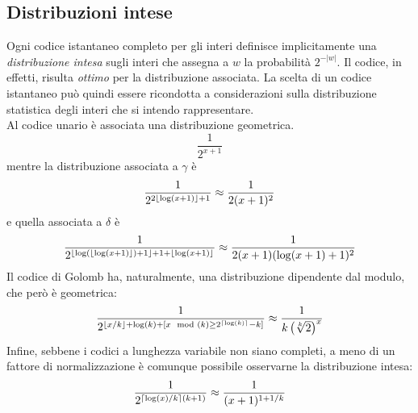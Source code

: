 
\subsection{Distribuzioni intese}
Ogni codice istantaneo completo per gli interi definisce implicitamente una \textit{distribuzione intesa} sugli interi che assegna a $w$ la probabilità $2^{-|w|}$. Il codice, in effetti, risulta \textit{ottimo} per la distribuzione associata. La scelta di un codice istantaneo può quindi essere ricondotta a considerazioni sulla distribuzione statistica degli interi che si intendo rappresentare.\\
Al codice unario è associata una distribuzione geometrica.
\begin{equation*}
    \frac{1}{2^{x + 1}}
\end{equation*}
mentre la distribuzione associata a $\gamma$ è
\begin{equation*}
    \frac{1}{2^{2\left\lfloor \log(x + 1) \right\rfloor + 1}} \approx \frac{1}{2(x + 1)^2}
\end{equation*}
e quella associata a $\delta$ è
\begin{equation*}
    \frac{1}{2^{\left\lfloor \log(\left\lfloor \log(x + 1) \right\rfloor) + 1 \right\rfloor + 1 + \left\lfloor \log(x + 1) \right\rfloor}} \approx \frac{1}{2(x + 1)(\log(x + 1) + 1)^2}
\end{equation*}
Il codice di Golomb ha, naturalmente, una distribuzione dipendente dal modulo, che però è geometrica:
\begin{equation*}
    \frac{1}{2^{\left\lfloor x / k \right\rfloor + \log(k) + [x\mod(k) \geq 2^{\left\lceil \log(k) \right\rceil} - k]}} \approx \frac{1}{k\left(\sqrt[k]{2}\right)^x}
\end{equation*}
Infine, sebbene i codici a lunghezza variabile non siano completi, a meno di un fattore di normalizzazione è comunque possibile osservarne la distribuzione intesa:
\begin{equation*}
    \frac{1}{2^{\left\lceil \log(x) / k \right\rceil(k + 1)}} \approx \frac{1}{(x + 1)^{1 + 1/k}}
\end{equation*}
